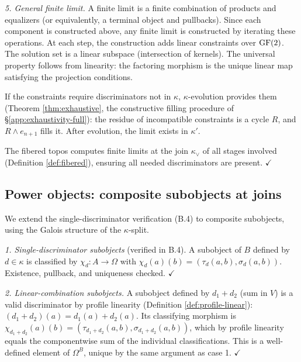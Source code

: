 \emph{5. General finite limit.}
A finite limit is a finite combination of products and
equalizers (or equivalently, a terminal object and
pullbacks). Since each component is constructed above,
any finite limit is constructed by iterating these
operations. At each step, the construction adds linear
constraints over $\operatorname{GF}(2)$. The solution set is a
linear subspace (intersection of kernels). The
universal property follows from linearity: the
factoring morphism is the unique linear map satisfying
the projection conditions.

If the constraints require discriminators not in $\kappa$,
$\kappa$-evolution provides them (Theorem
\ref{thm:exhaustive}, the constructive filling procedure
of \S\ref{app:exhaustivity-full}): the residue of
incompatible constraints is a cycle $R$, and
$R \wedge e_{n+1}$ fills it. After evolution, the limit
exists in $\kappa'$.

The fibered topos computes finite limits at the join
$\kappa_\vee$ of all stages involved (Definition
\ref{def:fibered}), ensuring all needed discriminators
are present. $\checkmark$


\subsection{Power objects: composite subobjects at joins}
\label{app:power-composite}

We extend the single-discriminator verification (B.4) to
composite subobjects, using the Galois structure of the
$\kappa$-split.

\emph{1. Single-discriminator subobjects} (verified in B.4).
A subobject of $B$ defined by $d \in \kappa$ is classified
by $\chi_d: A \to \Omega$ with $\chi_d(a)(b) =
(\tau_d(a,b), \sigma_d(a,b))$. Existence, pullback, and
uniqueness checked. $\checkmark$

\emph{2. Linear-combination subobjects.}
A subobject defined by $d_1 + d_2$ (sum in $V$) is a
valid discriminator by profile linearity
(Definition \ref{def:profile-linear}):
$(d_1 + d_2)(a) = d_1(a) + d_2(a)$.
Its classifying morphism is
$\chi_{d_1 + d_2}(a)(b) = (\tau_{d_1+d_2}(a,b),
\sigma_{d_1+d_2}(a,b))$, which by profile linearity
equals the componentwise sum of the individual
classifications. This is a well-defined element of
$\Omega^B$, unique by the same argument as case 1.
$\checkmark$

